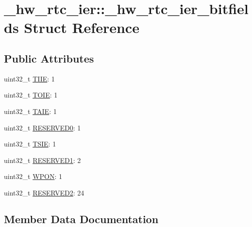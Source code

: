 \hypertarget{struct__hw__rtc__ier_1_1__hw__rtc__ier__bitfields}{}\section{\+\_\+hw\+\_\+rtc\+\_\+ier\+:\+:\+\_\+hw\+\_\+rtc\+\_\+ier\+\_\+bitfields Struct Reference}
\label{struct__hw__rtc__ier_1_1__hw__rtc__ier__bitfields}
\subsection*{Public Attributes}
\begin{DoxyCompactItemize}
\item 
uint32\+\_\+t \hyperlink{struct__hw__rtc__ier_1_1__hw__rtc__ier__bitfields_a3bae75bd73b51c7b3703fc06704554f0}{T\+I\+IE}\+: 1
\item 
uint32\+\_\+t \hyperlink{struct__hw__rtc__ier_1_1__hw__rtc__ier__bitfields_af0619c897d13fb4544e0be6f3bdfb363}{T\+O\+IE}\+: 1
\item 
uint32\+\_\+t \hyperlink{struct__hw__rtc__ier_1_1__hw__rtc__ier__bitfields_aa2eff9d640b632a2b5d419b62f34626d}{T\+A\+IE}\+: 1
\item 
uint32\+\_\+t \hyperlink{struct__hw__rtc__ier_1_1__hw__rtc__ier__bitfields_a43edfbcd8651d99bc6aadd08221e273e}{R\+E\+S\+E\+R\+V\+E\+D0}\+: 1
\item 
uint32\+\_\+t \hyperlink{struct__hw__rtc__ier_1_1__hw__rtc__ier__bitfields_a08a5bebf1769badc16164f035f887b7f}{T\+S\+IE}\+: 1
\item 
uint32\+\_\+t \hyperlink{struct__hw__rtc__ier_1_1__hw__rtc__ier__bitfields_a35d580a86af63aa800451ab6e7751ec4}{R\+E\+S\+E\+R\+V\+E\+D1}\+: 2
\item 
uint32\+\_\+t \hyperlink{struct__hw__rtc__ier_1_1__hw__rtc__ier__bitfields_aceb8a7f4af05330f522bb12ec42f433e}{W\+P\+ON}\+: 1
\item 
uint32\+\_\+t \hyperlink{struct__hw__rtc__ier_1_1__hw__rtc__ier__bitfields_aecebc531d20baddd8ea203d64d68082c}{R\+E\+S\+E\+R\+V\+E\+D2}\+: 24
\end{DoxyCompactItemize}


\subsection{Member Data Documentation}
